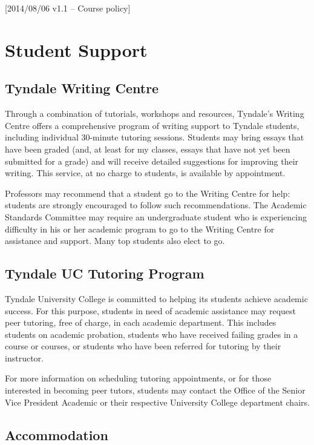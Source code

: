 [2014/08/06 v1.1 -- Course policy]

\section{Student Support}
\label{support}

\subsection{Tyndale Writing Centre}
\label{writing_centre}

Through a combination of tutorials, workshops and resources, Tyndale’s Writing
Centre offers a comprehensive program of writing support to Tyndale students,
including individual 30-minute tutoring sessions. Students may bring essays that
have been graded (and, at least for my classes, essays that have not yet been
submitted for a grade) and will receive detailed suggestions for improving their
writing. This service, at no charge to students, is available by appointment.

Professors may recommend that a student go to the Writing Centre for help:
students are strongly encouraged to follow such recommendations. The Academic
Standards Committee may require an undergraduate student who is experiencing
difficulty in his or her academic program to go to the Writing Centre for
assistance and support. Many top students also elect to go.

\subsection{Tyndale UC Tutoring Program}
\label{tutoring}

Tyndale University College is committed to helping its students achieve academic
success. For this purpose, students in need of academic assistance may request
peer tutoring, free of charge, in each academic department. This includes
students on academic probation, students who have received failing grades in a
course or courses, or students who have been referred for tutoring by their
instructor.

For more information on scheduling tutoring appointments, or for those
interested in becoming peer tutors, students may contact the Office of the
Senior Vice President Academic or their respective University College department
chairs.

\subsection{Accommodation}
\label{accommodation}


